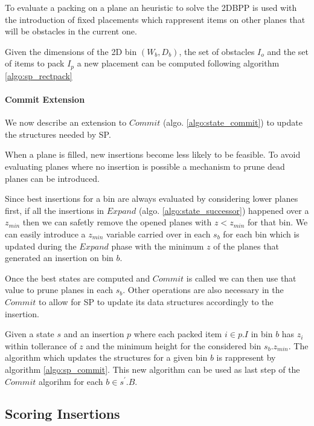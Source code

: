 To evaluate a packing on a plane an heuristic to solve the 2DBPP is used with the introduction of fixed placements which rappresent items on other planes that will be obstacles in the current one.


Given the dimensions of the 2D bin $(W_b, D_b)$, the set of obstacles $I_{o}$ and the set of items to pack $I_{p}$ a new placement can be computed following algorithm \ref{algo:sp_rectpack}



\paragraph*{Commit Extension}
We now describe an extension to $Commit$ (algo. \ref{algo:state_commit}) to update the structures needed by SP.

When a plane is filled, new insertions become less likely to be feasible. 
To avoid evaluating planes where no insertion is possible a mechanism to prune dead planes can be introduced.

Since best insertions for a bin are always evaluated by considering lower planes first, if all the insertions in $Expand$ (algo. \ref{algo:state_successor}) happened over a $z_{min}$ then we can safetly remove the opened planes with $z < z_{min}$ for that bin.
We can easily introduce a $z_{min}$ variable carried over in each $s_b$ for each bin which is updated during the $Expand$ phase with the minimum $z$ of the planes that generated an insertion on bin $b$.

Once the best states are computed and $Commit$ is called we can then use that value to prune planes in each $s_b$.
Other operations are also necessary in the $Commit$ to allow for SP to update its data structures accordingly to the insertion.

Given a state $s$ and an insertion $p$ where each packed item $i \in p.I$ in bin $b$ has $z_i$ within tollerance of $z$ and the minimum height for the considered bin $s_b.z_{min}$.
The algorithm which updates the structures for a given bin $b$ is rappresent by algorithm \ref{algo:sp_commit}.
This new algorithm can be used as last step of the $Commit$ algorihm for each $b \in s^\prime.B$.



\subsection{Scoring Insertions}
\label{ssec:scoring_insertions}%